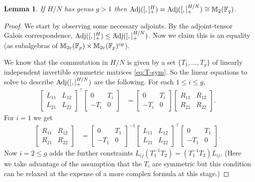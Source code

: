 \documentclass[11pt]{article}
\numberwithin{equation}{section}
\theoremstyle{definition}
\theoremstyle{plain}
\numberwithin{equation}{section}
\theoremstyle{plain}       %
\newtheorem{lem}[equation]{Lemma}
\theoremstyle{remark}
\theoremstyle{definition}
\numberwithin{figure}{section}
\numberwithin{table}{section}
\newcommand{\bbF}{\mathbb{F}}  %
\begin{document}
\begin{lem}\label{lem:adj}
If $H/N$ has genus $g>1$ then ${\rm Adj}([,]_+^H)={\rm Adj}([,]_+^{H/N})\cong
\mathbb{M}_2(\bbF_q)$.
\end{lem}
\begin{proof}
We start by observing some necessary adjoints. By the adjoint-tensor Galois
correspondence, ${\rm Adj}([,]_+^H)\leq {\rm Adj}([,]_+^{H/N})$.  Now we claim
this is an equality (as subalgebras of $\mathbb{M}_{2e}(\bbF_p)\times
\mathbb{M}_{2e}(\bbF_p)^{\rm op}$).


We know that the commutation in $H/N$ is given by a set $\{T_1,\dots,T_g\}$ of
linearly independent invertible symmetric matrices \eqref{eq:T-sym}.  So the
linear equations to solve to describe ${\rm Adj}([,]_+^{H/N})$ are the
following.  For each $1\leq i\leq g$,
\begin{align*}
	\begin{bmatrix}
		L_{11} & L_{12}\\ 
		L_{21} & L_{22}
	\end{bmatrix}^{\top}
	\begin{bmatrix}
	0 & T_i\\
	-T_i & 0 
	\end{bmatrix}
	& =
	\begin{bmatrix}
	0 & T_i\\
	-T_i & 0 
	\end{bmatrix}
	\begin{bmatrix}
		R_{11} & R_{12}\\ 
		R_{21} & R_{22}
	\end{bmatrix}.
\end{align*}
For $i=1$ we get 
\begin{align*}
	\begin{bmatrix}
		R_{11} & R_{12} \\
		R_{21} & R_{22}
	\end{bmatrix}
	& =
	\begin{bmatrix}
		0 & T_1 \\
		-T_1 & 0
	\end{bmatrix}^{-1}
	\begin{bmatrix}
		L_{11} & L_{12}\\
		L_{21} & L_{22}
	\end{bmatrix}^{\top}
	\begin{bmatrix}
		0 & T_1 \\ -T_1 & 0
	\end{bmatrix}.
\end{align*}
Now $i=2\leq g$ adds the further constraints $L_{ij}(T_1^{-1}T_2)=(T_1^{-1}
T_2)L_{ij}$. (Here we take advantage of the assumption that the $T_i$ are
symmetric but this condition can be relaxed at the expense of a more complex
formula at this stage.)


\end{proof}
\end{document}
